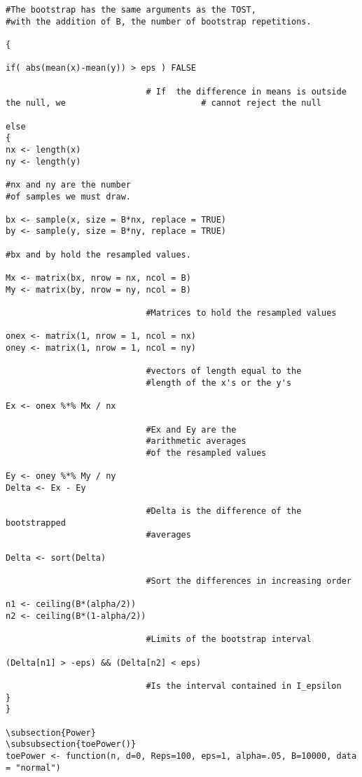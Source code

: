 \begin{verbatim}
#The bootstrap has the same arguments as the TOST, 
#with the addition of B, the number of bootstrap repetitions.

{

if( abs(mean(x)-mean(y)) > eps ) FALSE 
							
							# If  the difference in means is outside the null, we 							# cannot reject the null

else
{
nx <- length(x)
ny <- length(y)					

#nx and ny are the number 
#of samples we must draw.

bx <- sample(x, size = B*nx, replace = TRUE)
by <- sample(y, size = B*ny, replace = TRUE)	

#bx and by hold the resampled values.

Mx <- matrix(bx, nrow = nx, ncol = B)
My <- matrix(by, nrow = ny, ncol = B)	
							
							#Matrices to hold the resampled values
							
onex <- matrix(1, nrow = 1, ncol = nx)
oney <- matrix(1, nrow = 1, ncol = ny)
 
							#vectors of length equal to the
							#length of the x's or the y's
							
Ex <- onex %*% Mx / nx			
							
							#Ex and Ey are the 
							#arithmetic averages
							#of the resampled values
							
Ey <- oney %*% My / ny
Delta <- Ex - Ey					

							#Delta is the difference of the bootstrapped
							#averages

Delta <- sort(Delta)

							#Sort the differences in increasing order

n1 <- ceiling(B*(alpha/2))
n2 <- ceiling(B*(1-alpha/2))	

							#Limits of the bootstrap interval

(Delta[n1] > -eps) && (Delta[n2] < eps)

							#Is the interval contained in I_epsilon
}
}

\subsection{Power}
\subsubsection{toePower()}
toePower <- function(n, d=0, Reps=100, eps=1, alpha=.05, B=10000, data = "normal")


\end{verbatim}

